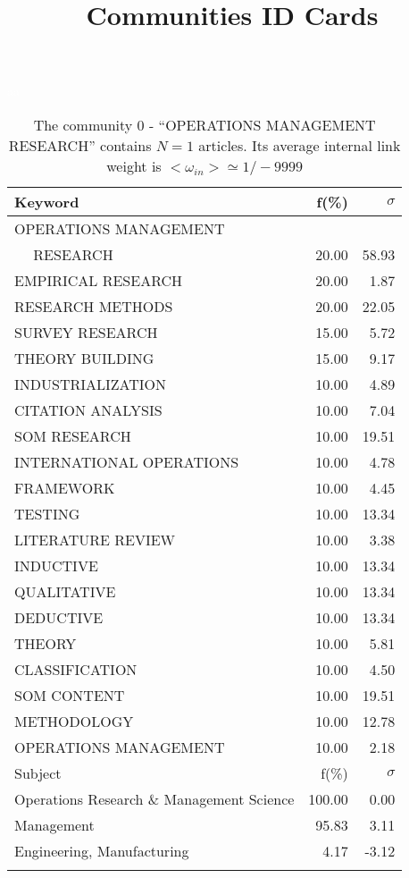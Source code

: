 \documentclass[a4paper,11pt]{report}
\title{{\bf Communities ID Cards}}
\date{\begin{flushleft}This document gather the ``ID Cards'' of the CC communities found within your database.\\
 The CC network was built by keeping a link between articles sharing at least 10 references. The communities characterized here correspond to the ones found in the level 0 (in the sense of the Louvain algo) which gathers more than 0 articles.\\
 These ID cards displays the most frequent keywords, subject categories, journals of publication, institution, countries, authors, references and reference journals of the articles of each community. The significance of an item $\sigma = \sqrt{N} (f - p) / \sqrt{p(1-p)}$ [where $N$ is the number of articles within the community and $f$ and $p$ are the proportion of articles respectively within the community and within the database displaying that item ] is also given (for example $\sigma > 5$ is really highly significant).\\
\vspace{1cm}
\copyright Sebastian Grauwin, Liu Weizhi - (2014) \end{flushleft}}
\begin{document}
\begin{landscape}
\maketitle
\clearpage

\begin{table}[!ht]
\caption{The community 0 - ``OPERATIONS MANAGEMENT RESEARCH'' contains $N = 1$ articles. Its average internal link weight is $<\omega_{in}> \simeq 1/-9999$ }
\textcolor{white}{aa}\\
{\scriptsize\begin{tabular}{|l r r|}
\hline
Keyword & f(\%) & $\sigma$\\
\hline
OPERATIONS MANAGEMENT &  & \\
$\quad$ RESEARCH & 20.00 & 58.93\\
EMPIRICAL RESEARCH & 20.00 & 1.87\\
RESEARCH METHODS & 20.00 & 22.05\\
SURVEY RESEARCH & 15.00 & 5.72\\
THEORY BUILDING & 15.00 & 9.17\\
INDUSTRIALIZATION & 10.00 & 4.89\\
CITATION ANALYSIS & 10.00 & 7.04\\
SOM RESEARCH & 10.00 & 19.51\\
INTERNATIONAL OPERATIONS & 10.00 & 4.78\\
FRAMEWORK & 10.00 & 4.45\\
TESTING & 10.00 & 13.34\\
LITERATURE REVIEW & 10.00 & 3.38\\
INDUCTIVE & 10.00 & 13.34\\
QUALITATIVE & 10.00 & 13.34\\
DEDUCTIVE & 10.00 & 13.34\\
THEORY & 10.00 & 5.81\\
CLASSIFICATION & 10.00 & 4.50\\
SOM CONTENT & 10.00 & 19.51\\
METHODOLOGY & 10.00 & 12.78\\
OPERATIONS MANAGEMENT & 10.00 & 2.18\\
\hline
\hline
Subject & f(\%) & $\sigma$\\
\hline
Operations Research \& Management Science & 100.00 & 0.00\\
Management & 95.83 & 3.11\\
Engineering, Manufacturing & 4.17 & -3.12\\
 &  & \\

\end{tabular}}
\end{table}
\end{landscape}
\end{document}
